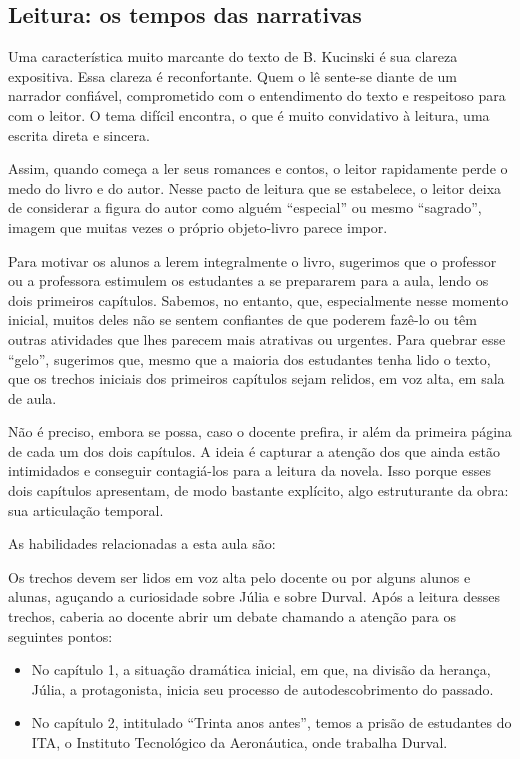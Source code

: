 \documentclass[12pt]{extarticle}
\begin{document}
\subsection{Leitura: os tempos das narrativas}

Uma característica muito marcante do texto de B. Kucinski é sua clareza
expositiva. Essa clareza é reconfortante. Quem o lê sente-se diante de
um narrador confiável, comprometido com o entendimento do texto e
respeitoso para com o leitor. O tema difícil encontra, o que é muito
convidativo à leitura, uma escrita direta e sincera.

Assim, quando começa a ler seus romances e contos, o leitor rapidamente
perde o medo do livro e do autor. Nesse pacto de leitura que se
estabelece, o leitor deixa de considerar a figura do autor como alguém
``especial'' ou mesmo ``sagrado'', imagem que muitas vezes o próprio
objeto-livro parece impor.

Para motivar os alunos a lerem integralmente o livro, sugerimos que o
professor ou a professora estimulem os estudantes a se prepararem para a
aula, lendo os dois primeiros capítulos. Sabemos, no entanto, que,
especialmente nesse momento inicial, muitos deles não se sentem
confiantes de que poderem fazê-lo ou têm outras atividades que lhes
parecem mais atrativas ou urgentes. Para quebrar esse ``gelo'',
sugerimos que, mesmo que a maioria dos estudantes tenha lido o texto,
que os trechos iniciais dos primeiros capítulos sejam relidos, em voz
alta, em sala de aula.

Não é preciso, embora se possa, caso o docente prefira, ir além da
primeira página de cada um dos dois capítulos. A ideia é capturar a
atenção dos que ainda estão intimidados e conseguir contagiá-los para a
leitura da novela. Isso porque esses dois capítulos apresentam, de modo
bastante explícito, algo estruturante da obra: sua articulação temporal.

As habilidades relacionadas a esta aula são:


Os trechos devem ser lidos em voz alta pelo docente ou por alguns alunos
e alunas, aguçando a curiosidade sobre Júlia e sobre Durval. Após a
leitura desses trechos, caberia ao docente abrir um debate chamando a
atenção para os seguintes pontos:

\begin{itemize}
\item No capítulo 1, a situação dramática inicial, em que, na divisão da
  herança, Júlia, a protagonista, inicia seu processo de
  autodescobrimento do passado.
  
\item No capítulo 2, intitulado ``Trinta anos antes'', temos a prisão de
  estudantes do ITA, o Instituto Tecnológico da Aeronáutica, onde
  trabalha Durval.
\end{itemize}
\end{document}
